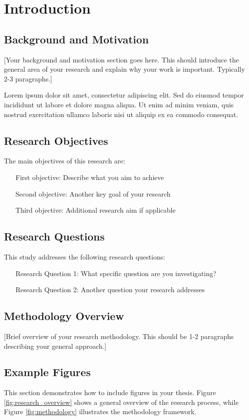 \chapter{Introduction}

\section{Background and Motivation}
[Your background and motivation section goes here. This should introduce the general area of your research and explain why your work is important. Typically 2-3 paragraphs.]

Lorem ipsum dolor sit amet, consectetur adipiscing elit. Sed do eiusmod tempor incididunt ut labore et dolore magna aliqua. Ut enim ad minim veniam, quis nostrud exercitation ullamco laboris nisi ut aliquip ex ea commodo consequat.

\section{Research Objectives}
The main objectives of this research are:
\begin{enumerate}
\item [First objective: Describe what you aim to achieve]
\item [Second objective: Another key goal of your research]
\item [Third objective: Additional research aim if applicable]
\end{enumerate}

\section{Research Questions}
This study addresses the following research questions:
\begin{enumerate}
\item [Research Question 1: What specific question are you investigating?]
\item [Research Question 2: Another question your research addresses]
\end{enumerate}

\section{Methodology Overview}
[Brief overview of your research methodology. This should be 1-2 paragraphs describing your general approach.]

\section{Example Figures}
This section demonstrates how to include figures in your thesis. Figure \ref{fig:research_overview} shows a general overview of the research process, while Figure \ref{fig:methodology} illustrates the methodology framework.

